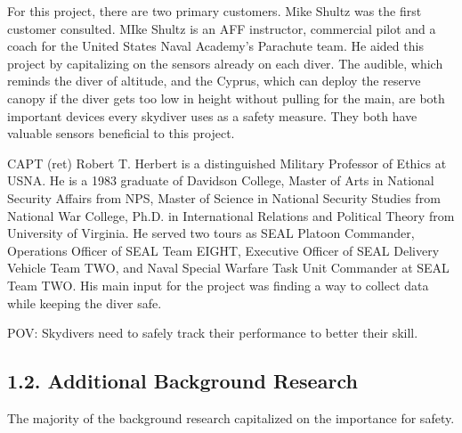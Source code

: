 \documentclass[10pt]{article}
\begin{document}
For this project, there are two primary customers. Mike Shultz was the first customer consulted. MIke Shultz is an AFF instructor, commercial pilot and a coach for the United States Naval Academy’s Parachute team. He aided this project by capitalizing on the sensors already on each diver. The audible, which reminds the diver of altitude, and the Cyprus, which can deploy the reserve canopy if the diver gets too low in height without pulling for the main, are both important devices every skydiver uses as a safety measure. They both have valuable sensors beneficial to this project.



CAPT (ret) Robert T. Herbert is a distinguished Military Professor of Ethics at USNA. He is a 1983 graduate of Davidson College, Master of Arts in National Security Affairs from NPS, Master of Science in National Security Studies from National War College, Ph.D. in International Relations and Political Theory from University of Virginia. He served two tours as SEAL Platoon Commander, Operations Officer of SEAL Team EIGHT, Executive Officer of SEAL Delivery Vehicle Team TWO, and Naval Special Warfare Task Unit Commander at SEAL Team TWO. His main input for the project was finding a way to collect data while keeping the diver safe.



POV: Skydivers need to safely track their performance to better their skill.



\subsection{1.2. Additional Background Research}

The majority of the background research capitalized on the importance for safety. 
\end{document}
